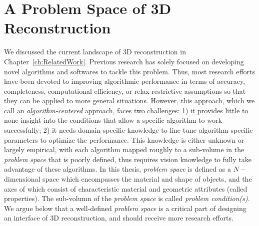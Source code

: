 
\chapter{A Problem Space of 3D Reconstruction}
\label{ch:3DRecon_ProbSpace}
We discussed the current landscape of 3D reconstruction in Chapter~\ref{ch:RelatedWork}. Previous research has solely focused on developing novel algorithms and softwares to tackle this problem. Thus, most research efforts have been devoted to improving algorithmic performance in terms of accuracy, completeness, computational efficiency, or relax restrictive assumptions so that they can be applied to more general situations. However, this approach, which we call an \textit{algorithm-centered} approach, faces two challenges: 1) it provides little to none insight into the conditions that allow a specific algorithm to work successfully; 2) it needs domain-specific knowledge to fine tune algorithm specific parameters to optimize the performance. This knowledge is either unknown or largely empirical, with each algorithm mapped roughly to a sub-volume in the \textit{problem space} that is poorly defined, thus requires vision knowledge to fully take advantage of these algorithms. In this thesis, \textit{problem space} is defined as a $N-$dimensional space which encompasses the material and shape of objects, and the axes of which consist of characteristic material and geometric attributes (called properties). The sub-volumn of the \textit{problem space} is called \textit{problem condition(s)}. We argue below that a well-defined \textit{problem space} is a critical part of designing an interface of 3D reconstruction, and should receive more research efforts.



